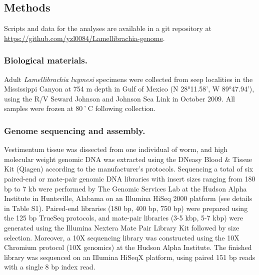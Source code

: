 \documentclass[]{article}
\begin{document}
\hypertarget{methods}{%
\subsection{Methods}\label{methods}}

Scripts and data for the analyses are available in a git repository at
\url{https://github.com/yzl0084/Lamellibrachia-genome}.

\hypertarget{biological-materials.}{%
\subsubsection{Biological materials.}\label{biological-materials.}}

Adult \emph{Lamellibrachia} \emph{luymesi} specimens were collected from
seep localities in the Mississippi Canyon at 754 m depth in Gulf of
Mexico (N 28°11.58', W 89°47.94'), using the R/V Seward Johnson and
Johnson Sea Link in October 2009. All samples were frozen at 80˚C
following collection.

\hypertarget{genome-sequencing-and-assembly.}{%
\subsubsection{Genome sequencing and
assembly.}\label{genome-sequencing-and-assembly.}}

Vestimentum tissue was dissected from one individual of worm, and high
molecular weight genomic DNA was extracted using the DNeasy Blood \&
Tissue Kit (Qiagen) according to the manufacturer's protocols.
Sequencing a total of six paired-end or mate-pair genomic DNA libraries
with insert sizes ranging from 180 bp to 7 kb were performed by The
Genomic Services Lab at the Hudson Alpha Institute in Huntsville,
Alabama on an Illumina HiSeq 2000 platform (see details in Table S1).
Paired-end libraries (180 bp, 400 bp, 750 bp) were prepared using the
125 bp TrueSeq protocols, and mate-pair libraries (3-5 kbp, 5-7 kbp)
were generated using the Illumina Nextera Mate Pair Library Kit followed
by size selection. Moreover, a 10X sequencing library was constructed
using the 10X Chromium protocol (10X genomics) at the Hudson Alpha
Institute. The finished library was sequenced on an Illumina HiSeqX
platform, using paired 151 bp reads with a single 8 bp index read.
\end{document}
